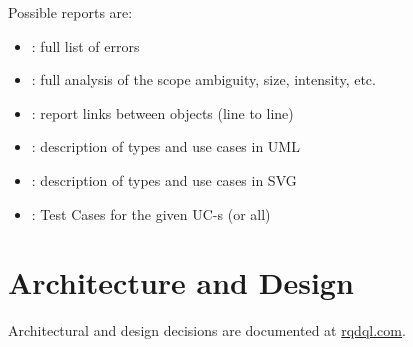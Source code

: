 \documentclass[12pt,oneside,letterpaper]{article}
\begin{document}
    Possible reports are:

    \begin{itemize}
        \item {}: full list of errors
        \item {}: full analysis of the scope ambiguity, size, intensity, etc.
        \item {}: report links between objects (line to line)
        \item {}: description of types and use cases in UML
        \item {}: description of types and use cases in SVG
        \item {}: Test Cases for the given UC-s (or all)
    \end{itemize}





\section{Architecture and Design}
\label{sec:design}

    Architectural and design decisions are documented at
    \href{http://www.rqdql.com}{rqdql.com}.





{}
\end{document}
